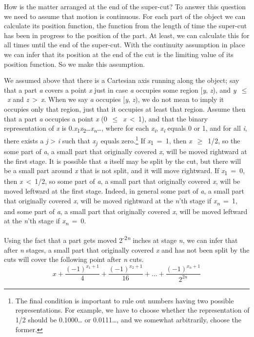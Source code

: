 \documentclass[
  10pt,
  letterpaper,
  DIV=11,
  numbers=noendperiod,
  twoside]{scrartcl}
\begin{document}
How is the matter arranged at the end of the super-cut? To answer this
question we need to assume that motion is continuous. For each part of
the object we can calculate its position function, the function from the
length of time the super-cut has been in progress to the position of the
part. At least, we can calculate this for all times until the end of the
super-cut. With the continuity assumption in place we can infer that its
position at the end of the cut is the limiting value of its position
function. So we make this assumption.

We assumed above that there is a Cartesian axis running along the
object; say that a part \emph{a} covers a point \emph{x} just in case
\emph{a} occupies some region {[}\emph{y}, \emph{z}), and
\emph{y}~\({\leq}\)~\emph{x} and \emph{z}~\textgreater~\emph{x}. When we
say \emph{a} occupies {[}\emph{y}, \emph{z}), we do not mean to imply it
occupies only that region, just that it occupies at least that region.
Assume then that a part \emph{a} occupies a point \emph{x}
(0~\({\leq}\)~\emph{x}~\textless~1), and that the binary representation
of \emph{x} is
0.\emph{x}\textsubscript{1}\emph{x}\textsubscript{2}\ldots{}\emph{x\textsubscript{n}}\ldots,
where for each \emph{x\textsubscript{i}}, \emph{x\textsubscript{i}}
equals 0 or 1, and for all \emph{i}, there exists a \emph{j}
\textgreater{} \emph{i} such that \emph{x\textsubscript{j}}~equals
zero.\footnote{The final condition is important to rule out numbers
  having two possible representations. For example, we have to choose
  whether the representation of 1/2 should be 0.1000\ldots{} or
  0.0111\ldots, and we somewhat arbitrarily, choose the former.} If
\emph{x}\textsubscript{1}~=~1, then \emph{x}~\({\geq}\)~1/2, so the some
part of \emph{a}, a small part that originally covered \emph{x}, will be
moved rightward at the first stage. It is possible that \emph{a} itself
may be split by the cut, but there will be a small part around \emph{x}
that is not split, and it will move rightward. If
\emph{x}\textsubscript{1}~=~0, then \emph{x}~\textless~1/2, so some part
of \emph{a}, a small part that originally covered \emph{x}, will be
moved leftward at the first stage. Indeed, in general some part of
\emph{a}, a small part that originally covered \emph{x}, will be moved
rightward at the \emph{n}'th stage if \emph{x\textsubscript{n}}~=~1, and
some part of \emph{a}, a small part that originally covered \emph{x},
will be moved leftward at the \emph{n}'th stage if
\emph{x\textsubscript{n}}~=~0.

Using the fact that a part gets moved 2\textsuperscript{-2\emph{n}}
inches at stage \emph{n}, we can infer that after \emph{n} stages, a
small part that originally covered \emph{x} and has not been split by
the cuts will cover the following point after \emph{n} cuts.
\[x + \frac{(-1)^{x_1 + 1}}{4} + \frac{(-1)^{x_2 + 1}}{16} + \dots + \frac{(-1)^{x_n + 1}}{2^{2n}}\]
\end{document}
